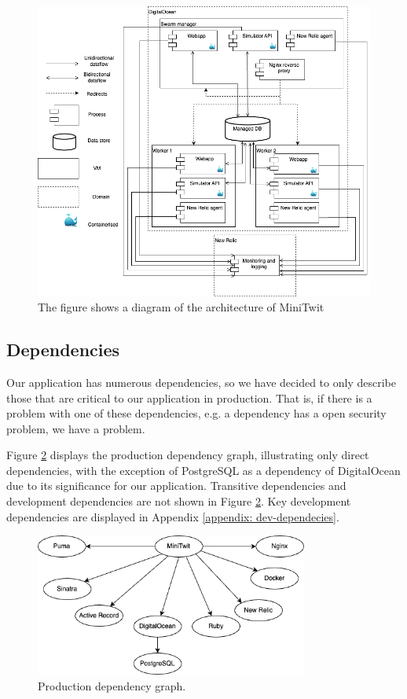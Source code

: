 \documentclass{article}
\begin{document}
\begin{figure}[H]
    \centering
    \includegraphics[width=\textwidth]{images/devops-overview-3.png}
    \caption{The figure shows a diagram of the architecture of MiniTwit}
    \label{fig:architecture}
\end{figure}

\subsection{Dependencies}
Our application has numerous dependencies, so we have decided to only describe those that are critical to our application in production. That is, if there is a problem with one of these dependencies, e.g. a dependency has a open security problem, we have a problem. 

Figure \ref{fig:dep-prod} displays the production dependency graph, illustrating only direct dependencies, with the exception of PostgreSQL as a dependency of DigitalOcean due to its significance for our application. Transitive dependencies and development dependencies are not shown in Figure \ref{fig:dep-prod}. Key development dependencies are displayed in Appendix \ref{appendix: dev-dependecies}.

\begin{figure}[H]
    \centering
    \includegraphics[width=0.8\textwidth]{images/dependency-graph-prod.png}
    \caption{Production dependency graph.}
    \label{fig:dep-prod}
\end{figure}
\end{document}
